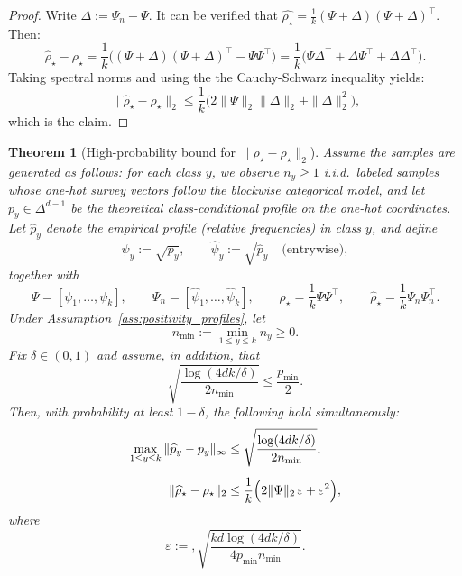 \documentclass[preprint,11pt]{elsarticle}
\newtheorem{Theorem}{Theorem}[section]
\begin{document}
\begin{proof}
Write $\Delta:=\Psi_n-\Psi$. It can be verified that $\hat{\rho_\star} = \frac{1}{k}(\Psi+\Delta)(\Psi+\Delta)^\top$. Then:
\[
\widehat\rho_\star-\rho_\star
=
\frac{1}{k}\bigl((\Psi+\Delta)(\Psi+\Delta)^\top-\Psi\Psi^\top\bigr)
=
\frac{1}{k}\bigl(\Psi\Delta^\top+\Delta\Psi^\top+\Delta\Delta^\top\bigr).
\]
Taking spectral norms and using the the Cauchy-Schwarz inequality yields:
\[
\|\widehat\rho_\star-\rho_\star\|_2
\le
\frac{1}{k}\bigl(2\|\Psi\|_2\|\Delta\|_2+\|\Delta\|_2^2\bigr),
\]
which is the claim.
\end{proof}

\begin{Theorem}[High-probability bound for $\|\widehat\rho_\star-\rho_\star\|_2$]
\label{thm:rho_perturbation_multinomial}
Assume the samples are generated as follows: for each class $y$, we observe $n_y\ge 1$ i.i.d.\ labeled samples whose one-hot survey vectors
follow the blockwise categorical model, and let $p_y\in\Delta^{d-1}$ be the theoretical class-conditional profile on the one-hot coordinates.
Let $\widehat p_y$ denote the empirical profile (relative frequencies) in class $y$, and define
\[
\psi_y:=\sqrt{p_y},\qquad \widehat\psi_y:=\sqrt{\widehat p_y}
\quad\text{(entrywise)},
\]
together with
\[
\Psi=[\psi_1,\dots,\psi_k],\qquad \Psi_n=[\widehat\psi_1,\dots,\widehat\psi_k],\qquad
\rho_\star=\frac{1}{k}\Psi\Psi^\top,\qquad \widehat\rho_\star=\frac{1}{k}\Psi_n\Psi_n^\top.
\]
Under Assumption~\ref{ass:positivity_profiles}, let
\[
n_{\min}:=\min_{1\le y\le k} n_y \geq 0.
\]
Fix $\delta\in(0,1)$ and assume, in addition, that
\begin{equation}
\label{eq:positivity_transfer_condition}
\sqrt{\frac{\log(4dk/\delta)}{2n_{\min}}}\le \frac{p_{\min}}{2}.
\end{equation}
Then, with probability at least $1-\delta$, the following hold simultaneously:
\begin{align}
\max_{1\le y\le k}\|\widehat p_y-p_y\|_\infty
&\le
\sqrt{\frac{\log(4dk/\delta)}{2n_{\min}}}, \label{eq:uniform_profile_bound_nmin}\\[0.5em]
\|\widehat\rho_\star-\rho_\star\|_2
&\le
\frac{1}{k}\Bigl(2\|\Psi\|_2\,\varepsilon+\varepsilon^2\Bigr), \label{eq:rho_bound_eps}
\end{align}
where
\begin{equation}
\label{eq:epsilon_def_nmin}
\varepsilon
:=
,
\sqrt{\frac{kd\log(4dk/\delta)}{4p_{\min}n_{\min}}}.
\end{equation}
\end{Theorem}
\end{document}
